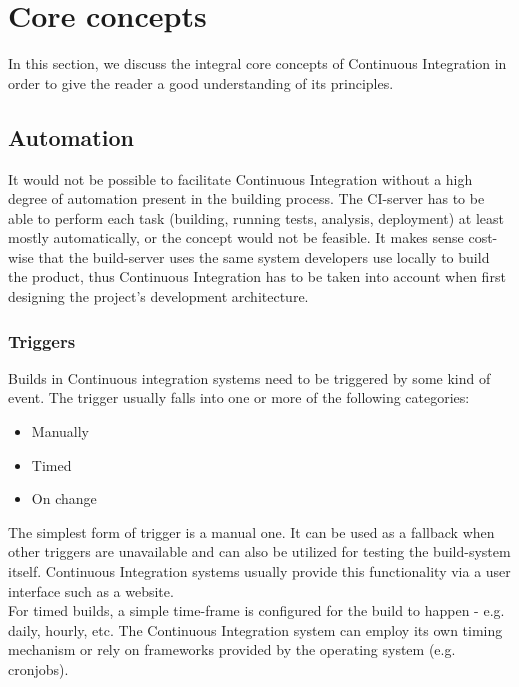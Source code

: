 \section{Core concepts}\label{sec:core-concepts}

In this section, we discuss the integral core concepts of Continuous Integration
in order to give the reader a good understanding of its principles.

\subsection{Automation}\label{sec:automation}

It would not be possible to facilitate Continuous Integration without a high
degree of automation present in the building process. The CI-server has to be
able to perform each task (building, running tests, analysis, deployment) at
least mostly automatically, or the concept would not be feasible. It makes sense
cost-wise that the build-server uses the same system developers use locally to
build the product, thus Continuous Integration has to be taken into account when
first designing the project's development architecture.\\

\subsubsection{Triggers}

Builds in Continuous integration systems need to be triggered by some kind of
event. The trigger usually falls into one or more of the following categories:

\begin{itemize}
    \item Manually
    \item Timed
    \item On change
\end{itemize}

The simplest form of trigger is a manual one. It can be used as a fallback when
other triggers are unavailable and can also be utilized for testing the
build-system itself. Continuous Integration systems usually provide this
functionality via a user interface such as a website.\\

For timed builds, a simple time-frame is configured for the build to happen -
e.g. daily, hourly, etc. The Continuous Integration system can employ its own
timing mechanism or rely on frameworks provided by the operating system (e.g.
cronjobs).\\

